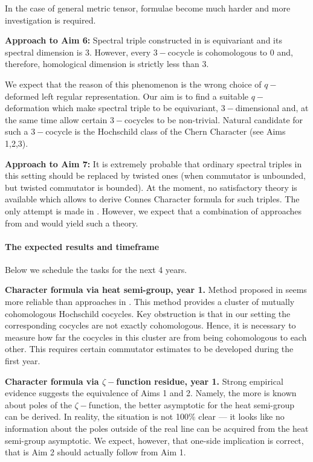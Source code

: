 \documentclass{article}
\begin{document}
In the case of general metric tensor, formulae become much harder and more investigation is required.

{\bf Approach to Aim 6:} Spectral triple constructed in \cite{ChakrabortyPal} is equivariant and its spectral dimension is $3.$ However, every $3-$cocycle is cohomologous to $0$ and, therefore, homological dimension is strictly less than $3.$ 

We expect that the reason of this phenomenon is the wrong choice of $q-$deformed left regular representation. Our aim is to find a suitable $q-$deformation which make spectral triple to be equivariant, $3-$dimensional and, at the same time allow certain $3-$cocycles to be non-trivial. Natural candidate for such a $3-$cocycle is the Hochschild class of the Chern Character (see Aims 1,2,3).

{\bf Approach to Aim 7:} It is extremely probable that ordinary spectral triples in this setting should be replaced by twisted ones (when commutator is unbounded, but twisted commutator is bounded). At the moment, no satisfactory theory is available which allows to derive Connes Character formula for such triples. The only attempt is made in \cite{MasF}. However, we expect that a combination of approaches from \cite{MasF} and \cite{CRSZ} would yield such a theory.

\paragraph*{The expected results and timeframe} Below we schedule the tasks for the next 4 years.

{\bf Character formula via heat semi-group, year 1.} Method proposed in \cite{CRSZ} seems more reliable than approaches in \cite{GVF}. This method provides a cluster of mutually cohomologous Hochschild cocycles. Key obstruction is that in our setting the corresponding cocycles are not exactly cohomologous. Hence, it is necessary to measure how far the cocycles in this cluster are from being cohomologous to each other. This requires certain  commutator estimates to be developed during the first year.

{\bf Character formula via $\zeta-$function residue, year 1.} Strong empirical evidence suggests the equivalence of Aims 1 and 2. Namely, the more is known about poles of the $\zeta-$function, the better asymptotic for the heat semi-group can be derived. In reality, the situation is not 100\% clear --- it looks like no information about the poles outside of the real line can be acquired from the heat semi-group asymptotic. We expect, however, that one-side implication is correct, that is Aim 2 should actually follow from Aim 1.
\end{document}
